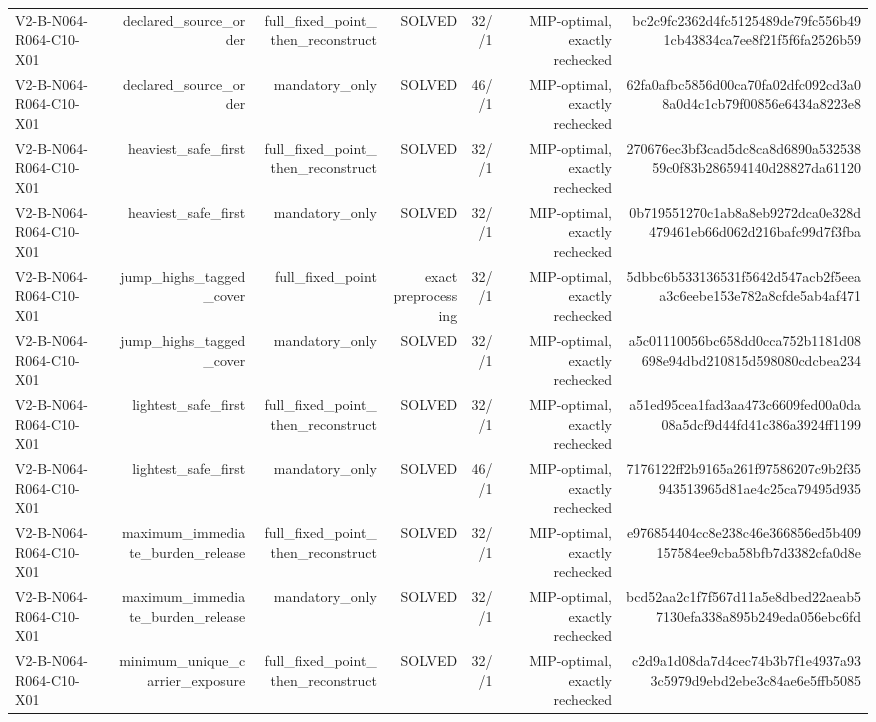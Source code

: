 {\begin{longtable}{lrrrrrr}
V2-B-N064-R064-C10-X01 & declared\_source\_order & full\_fixed\_point\_then\_reconstruct & SOLVED & 32//1 & MIP-optimal, exactly rechecked & bc2c9fc2362d4fc5125489de79fc556b491cb43834ca7ee8f21f5f6fa2526b59 \\
V2-B-N064-R064-C10-X01 & declared\_source\_order & mandatory\_only & SOLVED & 46//1 & MIP-optimal, exactly rechecked & 62fa0afbc5856d00ca70fa02dfc092cd3a08a0d4c1cb79f00856e6434a8223e8 \\
V2-B-N064-R064-C10-X01 & heaviest\_safe\_first & full\_fixed\_point\_then\_reconstruct & SOLVED & 32//1 & MIP-optimal, exactly rechecked & 270676ec3bf3cad5dc8ca8d6890a53253859c0f83b286594140d28827da61120 \\
V2-B-N064-R064-C10-X01 & heaviest\_safe\_first & mandatory\_only & SOLVED & 32//1 & MIP-optimal, exactly rechecked & 0b719551270c1ab8a8eb9272dca0e328d479461eb66d062d216bafc99d7f3fba \\
V2-B-N064-R064-C10-X01 & jump\_highs\_tagged\_cover & full\_fixed\_point & exact preprocessing & 32//1 & MIP-optimal, exactly rechecked & 5dbbc6b533136531f5642d547acb2f5eeaa3c6eebe153e782a8cfde5ab4af471 \\
V2-B-N064-R064-C10-X01 & jump\_highs\_tagged\_cover & mandatory\_only & SOLVED & 32//1 & MIP-optimal, exactly rechecked & a5c01110056bc658dd0cca752b1181d08698e94dbd210815d598080cdcbea234 \\
V2-B-N064-R064-C10-X01 & lightest\_safe\_first & full\_fixed\_point\_then\_reconstruct & SOLVED & 32//1 & MIP-optimal, exactly rechecked & a51ed95cea1fad3aa473c6609fed00a0da08a5dcf9d44fd41c386a3924ff1199 \\
V2-B-N064-R064-C10-X01 & lightest\_safe\_first & mandatory\_only & SOLVED & 46//1 & MIP-optimal, exactly rechecked & 7176122ff2b9165a261f97586207c9b2f35943513965d81ae4c25ca79495d935 \\
V2-B-N064-R064-C10-X01 & maximum\_immediate\_burden\_release & full\_fixed\_point\_then\_reconstruct & SOLVED & 32//1 & MIP-optimal, exactly rechecked & e976854404cc8e238c46e366856ed5b409157584ee9cba58bfb7d3382cfa0d8e \\
V2-B-N064-R064-C10-X01 & maximum\_immediate\_burden\_release & mandatory\_only & SOLVED & 32//1 & MIP-optimal, exactly rechecked & bcd52aa2c1f7f567d11a5e8dbed22aeab57130efa338a895b249eda056ebc6fd \\
V2-B-N064-R064-C10-X01 & minimum\_unique\_carrier\_exposure & full\_fixed\_point\_then\_reconstruct & SOLVED & 32//1 & MIP-optimal, exactly rechecked & c2d9a1d08da7d4cec74b3b7f1e4937a933c5979d9ebd2ebe3c84ae6e5ffb5085 \\

\end{longtable}}
